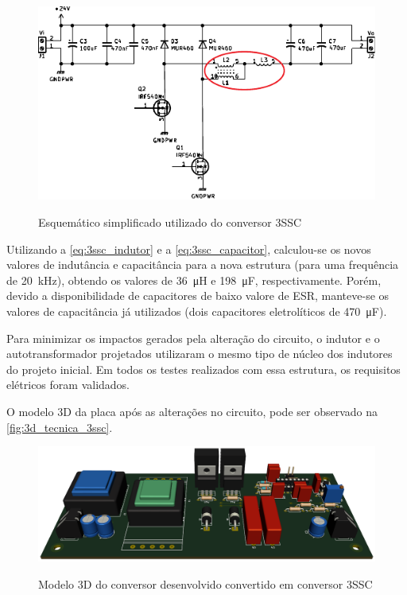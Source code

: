     \begin{figure}[H]
    	\centering
    	\caption{Esquemático simplificado utilizado do conversor 3SSC}
    	\includegraphics[scale=1.5]{pdf/layout/Esquematico_3ssc.pdf}
        \label{fig:esquematico_cbi_5}
    \end{figure}
    
    Utilizando a \autoref{eq:3ssc_indutor} e a \autoref{eq:3ssc_capacitor}, calculou-se os novos valores de indutância e capacitância para a nova estrutura (para uma frequência de \SI{20}{\kilo\hertz}), obtendo os valores de \SI{36}{\micro\henry} e \SI{198}{\micro\farad}, respectivamente. Porém, devido a disponibilidade de capacitores de baixo valore de ESR, manteve-se os valores de capacitância já utilizados (dois capacitores eletrolíticos de \SI{470}{\micro\farad}). 
    
    Para minimizar os impactos gerados pela alteração do circuito, o indutor e o autotransformador projetados utilizaram o mesmo tipo de núcleo dos indutores do projeto inicial. Em todos os testes realizados com essa estrutura, os requisitos elétricos foram validados. 
    
    O modelo 3D da placa após as alterações no circuito, pode ser observado na \autoref{fig:3d_tecnica_3ssc}.
    
    \begin{figure}[H]
    	\centering
    	\caption{Modelo 3D do conversor desenvolvido convertido em conversor 3SSC}
    	\includegraphics[scale=.35]{pdf/fotos/tecnica_3ssc.png}
        \label{fig:3d_tecnica_3ssc}
    \end{figure}
    
